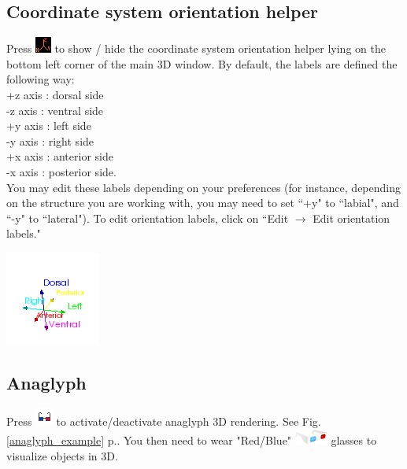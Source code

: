 \subsection{Coordinate system orientation helper}
\begin{minipage}{0.7\textwidth}
Press \includegraphics[scale=0.7]{images/06/display/orientation_helper.png} to show / hide the coordinate system orientation helper lying on the bottom left corner of the main 3D window. By default, the labels are defined
the following way:\\
+z axis : dorsal side\\
-z axis : ventral side\\
+y axis : left side\\
-y axis : right side\\
+x axis : anterior side\\
-x axis : posterior side.\\
You may edit these labels depending on your preferences (for instance,
depending on the structure you are working with, you may need to set ``+y" to ``labial", and ``-y" to
``lateral"). To edit orientation labels, click on ``Edit $\rightarrow$ Edit orientation labels."
\end{minipage}    
\begin{minipage}{0.3\textwidth}\centering
 \includegraphics[scale=0.7]{images/06/camera/orientation_helper_view.png}
 \end{minipage}   


\subsection{Anaglyph}
Press \includegraphics[scale=0.7]{images/06/display/anaglyph.png} to activate/deactivate anaglyph 3D rendering.
See Fig. \ref{anaglyph_example} p.\pageref{anaglyph_example}. You then need to wear "Red/Blue" \includegraphics[scale=0.7]{images/06/display/anaglyph_glasses.png} glasses to visualize objects in 3D.

